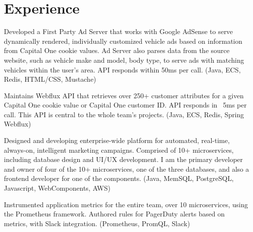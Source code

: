 \documentclass[letterpaper]{deedy-resume} %
\begin{document}
\hfill
%
%
\begin{minipage}[t]{0.7\textwidth} %


\section{Experience}


\vspace{\topsep} %

\begin{tightemize}
\item Developed a First Party Ad Server that works with Google AdSense to serve dynamically rendered, individually customized vehicle ads based on information from Capital One cookie values. Ad Server also parses data from the source website, such as vehicle make and model, body type, to serve ads with matching vehicles within the user's area. API responds within 50ms per call. (Java, ECS, Redis, HTML/CSS, Mustache)
\item Maintains Webflux API that retrieves over 250+ customer attributes for  a given Capital One cookie value or Capital One customer ID. API responds in ~5ms per call. This API is central to the whole team's projects. (Java, ECS, Redis, Spring Webflux)
\item Designed and developing enterprise-wide platform for automated, real-time, always-on, intelligent marketing campaigns. Comprised of 10+ microservices, including database design and UI/UX development. I am the primary developer and owner of four of the 10+ microservices, one of the three databases, and also a frontend developer for one of the components. (Java, MemSQL, PostgreSQL, Javascript, WebComponents, AWS)
\item Instrumented application metrics for the entire team, over 10 microservices, using the Prometheus framework. Authored rules for PagerDuty alerts based on metrics, with Slack integration. (Prometheus, PromQL, Slack) 
\end{tightemize}


\end{minipage}
\end{document}
